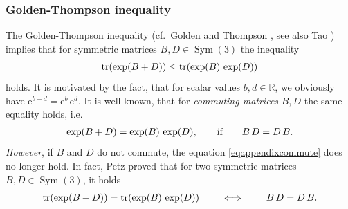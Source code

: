 \documentclass[10pt]{article}
\numberwithin{theoremCounter}{section}
\theoremstyle{plain}
\theoremstyle{definition}
\newcommand{\R}{\mathbb{R}}
\DeclareMathOperator{\Sym}{Sym}
\DeclareMathOperator{\tr}{tr}
\def\tr{\textnormal{tr}}
\numberwithin{equation}{section}
\begin{document}
\begin{appendix}
\subsubsection{Golden-Thompson inequality} \label{appgoldenth}
%
The Golden-Thompson inequality (cf.~Golden \cite{golden65} and Thompson \cite{thompson65}, see also Tao \cite{Tao}) implies that for symmetric matrices $B, D \in \Sym(3)$ the inequality
	\begin{align}
	\label{eqgoldenthompson}
	\tr(\exp(B+D)) \le \tr(\exp(B) \, \exp(D))
	\end{align}
holds. It is motivated by the fact, that for scalar values $b, d \in \R$, we obviously have $\mathrm{e}^{b + d} = \mathrm{e}^{b} \, \mathrm{e}^d$. It is well known, that for \emph{commuting matrices} $B, D$ the same equality holds, i.e.
	\begin{align}
	\label{eqappendixcommute}
	\exp(B + D) = \exp(B) \, \exp(D), \qquad \textnormal{if} \qquad B \, D = D \, B.
	\end{align}
\emph{However}, if $B$ and $D$ do not commute, the equation \eqref{eqappendixcommute} does no longer hold. In fact, Petz \cite{Petz1994} proved that for two symmetric matrices $B, D \in \Sym(3)$, it holds
	\begin{align}
	\tr(\exp(B+D)) = \tr(\exp(B) \, \exp(D)) \qquad \iff \qquad B \, D = D \, B.
	\end{align}




\end{appendix}
\end{document}
